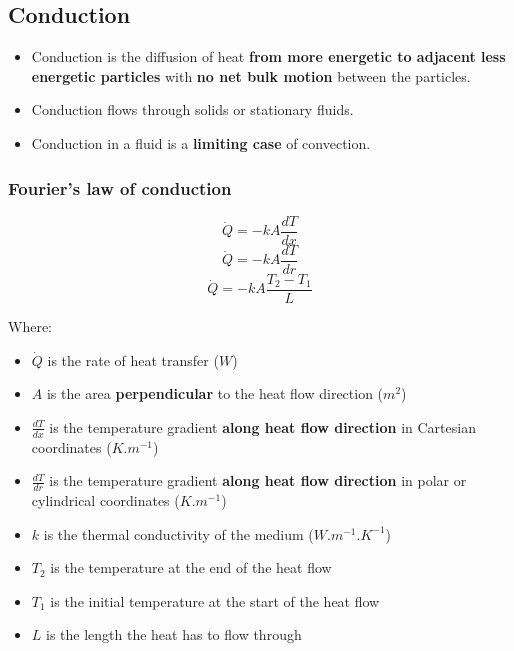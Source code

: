 \documentclass[11pt]{article}
\begin{document}
\subsection{Conduction}
\label{sec:org4cc056a}
\begin{itemize}
\item Conduction is the diffusion of heat \textbf{from more energetic to adjacent less energetic particles} with \textbf{no net bulk motion} between the particles.
\item Conduction flows through solids or stationary fluids.
\item Conduction in a fluid is a \textbf{limiting case} of convection.
\end{itemize}

 \newpage

\subsubsection{Fourier's law of conduction}
\label{sec:org3ae2c07}
\[\dot{Q} = -kA \frac{dT}{dx}\]
\[\dot{Q} = -kA \frac{dT}{dr}\]
\[\dot{Q} = -kA \frac{T_2 - T_1}{L}\]

Where:
\begin{itemize}
\item \(\dot{Q}\) is the rate of heat transfer (\(\unit{W}\))
\item \(A\) is the area \textbf{perpendicular} to the heat flow direction (\(\unit{m^2}\))
\item \(\frac{dT}{dx}\) is the temperature gradient \textbf{along heat flow direction} in Cartesian coordinates (\(\unit{K.m^{-1}}\))
\item \(\frac{dT}{dr}\) is the temperature gradient \textbf{along heat flow direction} in polar or cylindrical coordinates (\(\unit{K.m^{-1}}\))
\item \(k\) is the thermal conductivity of the medium (\(\unit{W.m^{-1}.K^{-1}}\))
\item \(T_2\) is the temperature at the end of the heat flow
\item \(T_1\) is the initial temperature at the start of the heat flow
\item \(L\) is the length the heat has to flow through
\end{itemize}
\end{document}
